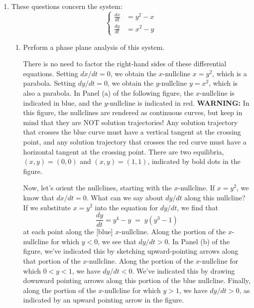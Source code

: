 \documentclass[main]{subfiles}
\begin{document}
\begin{enumerate}
\item \label{trapping-region}
These questions concern the system:
$$
  \left\{ \begin{aligned}
  \frac{dx}{dt} & = y^2 - x \\
  \frac{dy}{dt} & = x^2 - y
  \end{aligned} \right.
$$

  \begin{enumerate}
    \item
    \begin{problem}[3in]
      Perform a phase plane analysis of this system.
    \end{problem}

    \begin{solution}
    There is no need to factor the right-hand sides of these differential
    equations.  Setting $dx/dt = 0$, we obtain the $x$-nullcline $x = y^{2}$,
    which is a parabola.  Setting $dy/dt = 0$, we obtain the $y$-nullcline
    $y = x^2$, which is also a parabola.  In Panel (a) of the following figure,
    the $x$-nullcline is indicated in blue, and the $y$-nullcline is indicated
    in red.  {\bf WARNING:}  In this figure, the nullclines are rendered as
    continuous curves, but keep in mind that they are NOT solution trajectories!
    Any solution trajectory that crosses the blue curve must have a vertical
    tangent at the crossing point, and any solution trajectory that crosses the
    red curve must have a horizontal tangent at the crossing point.
    There are two equilibria, $(x,y) = (0,0)$ and $(x,y) = (1,1)$,
    indicated by bold dots in the figure.  

    Now, let's orient the nullclines, starting with the $x$-nullcline.  If
    $x = y^2$, we know that $dx/dt = 0$.  What can we say about $dy/dt$ along
    this nullcline?  If we substitute $x = y^2$ into the equation for $dy/dt$,
    we find that
    $$
	\frac{dy}{dt} = y^4 - y \; = \; y (y^3 - 1)
    $$  
    at each point along the [blue] $x$-nullcline.  Along the portion of the
    $x$-nullcline for which $y < 0$, we see that $dy/dt > 0$.  In Panel (b)
    of the figure, we've indicated this by sketching upward-pointing arrows
    along that portion of the $x$-nullcline.  Along the portion of the 
    $x$-nullcline for which $0 < y < 1$, we have $dy/dt < 0$.  We've indicated
    this by drawing downward pointing arrows along this portion of the blue
    nullcline.  Finally, along the portion of the $x$-nullcline for which 
    $y > 1$, we have $dy/dt > 0$, as indicated by an upward pointing arrow
    in the figure.


\end{solution}
\end{enumerate}
\end{enumerate}
\end{document}
